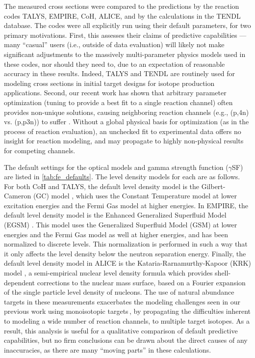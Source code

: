 The measured cross sections were compared to the predictions by the reaction codes TALYS, EMPIRE, CoH, ALICE, and by the calculations in the TENDL database.
The codes were all explicitly run using their default parameters, for two primary motivations. 
First, this  assesses their claims of  predictive capabilities  --- many \enquote{casual} users (i.e., outside of data evaluation) will likely not make significant adjustments to the massively multi-parameter physics models used in these codes, nor should they need to, due to an expectation of reasonable accuracy in these results.
Indeed, TALYS and TENDL  are routinely used for modeling cross sections in initial target designs for isotope production applications.
Second, our recent work has shown that  arbitrary parameter optimization (tuning to provide a best fit to a single reaction channel)  often provides non-unique solutions, causing neighboring reaction channels (e.g., (p,4n) vs. (p,p3n)) to suffer \cite{fox2020investigating}.
Without a global physical basis for optimization (as in the process of reaction evaluation), an unchecked fit to experimental data offers no insight for reaction modeling, and may propagate to highly non-physical results for  competing channels.

The default settings for the optical models and gamma strength function ($\gamma$SF) are listed in  \autoref{tab:fe_defaults}.
The level density models for each are as follows.
For both CoH and TALYS, the default level density model is the Gilbert-Cameron (GC) model \cite{Gilbert2011}, which uses the Constant Temperature model at lower excitation energies and the Fermi Gas model at higher energies.
In EMPIRE, the default level density model is the Enhanced Generalized Superfluid Model (EGSM) \cite{Giardina2002}.
This model uses the Generalized Superfluid Model (GSM) \cite{ignatyuk1979role,Ignatyuk1993} at lower energies and the Fermi Gas model as well at higher energies, and has been normalized to discrete levels.
This normalization is performed in such a way that it only affects the level density below the neutron separation energy.
Finally, the default level density model in ALICE is the Kataria-Rarnamurthy-Kapoor (KRK) model \cite{Kataria1978,Kataria1990}, a semi-empirical nuclear level density formula which provides shell-dependent corrections to the nuclear mass surface, based on a Fourier expansion of the single particle level density of nucleons.
The use of natural abundance targets in these measurements exacerbates the modeling  challenges seen in our previous work using monoisotopic targets\,\cite{Voyles2018a}, by propagating the difficulties inherent to modeling a wide number of reaction channels, to multiple target isotopes.
As a result, this analysis is useful for a qualitative comparison of default predictive capabilities, but no firm conclusions can be drawn about the direct causes of any inaccuracies, as there are many \enquote{moving parts} in these calculations.




